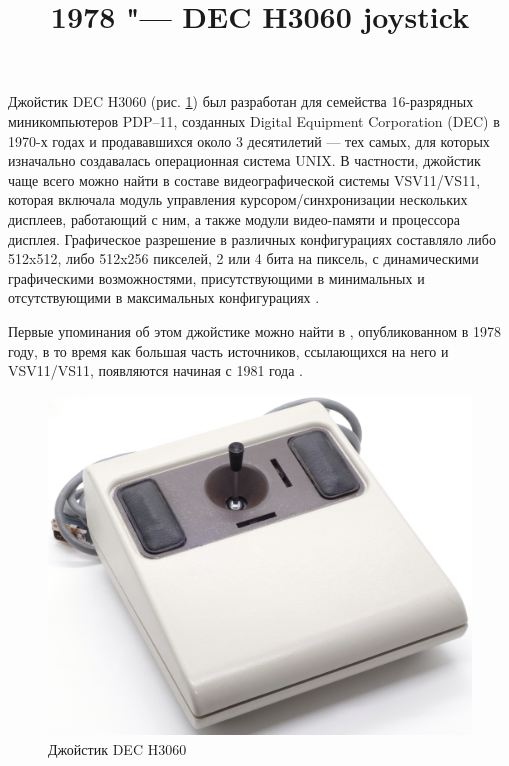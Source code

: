 \documentclass[11pt, a4paper]{article}
\begin{document}
\title{1978 "--- DEC H3060 joystick}
\date{}
\maketitle
{}

Джойстик DEC H3060 (рис. \ref{fig:DecJoystickPic}) был разработан для семейства 16-разрядных миникомпьютеров PDP–11, созданных Digital Equipment Corporation (DEC) в 1970-х годах и продававшихся около 3 десятилетий --- тех самых, для которых изначально создавалась операционная система UNIX. В частности, джойстик чаще всего можно найти в составе видеографической системы VSV11/VS11, которая включала модуль управления курсором/синхронизации нескольких дисплеев, работающий с ним, а также модули видео-памяти и процессора дисплея. Графическое разрешение в различных конфигурациях составляло либо 512x512, либо 512x256 пикселей, 2 или 4 бита на пиксель, с динамическими графическими возможностями, присутствующими в минимальных и отсутствующими в максимальных конфигурациях \cite{joystick}.

Первые упоминания об этом джойстике можно найти в \cite{fiche}, опубликованном в 1978 году, в то время как большая часть источников, ссылающихся на него и VSV11/VS11, появляются начиная с 1981 года \cite{flyer, vsv11}.

\begin{figure}[h]
   \centering
    \includegraphics[scale=0.53]{1978_dec_h3060_joystick/pic_30.jpg}
    \caption{Джойстик DEC H3060}
    \label{fig:DecJoystickPic}
\end{figure}
\end{document}
